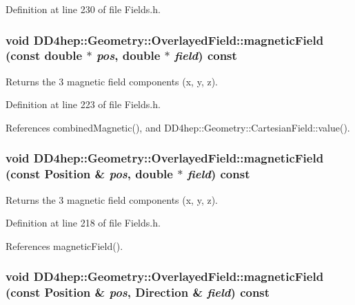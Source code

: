 Definition at line 230 of file Fields.h.\hypertarget{class_d_d4hep_1_1_geometry_1_1_overlayed_field_ae02970e5b4ec1575adcfdb05345e7316}{
\subsubsection[{magneticField}]{\setlength{\rightskip}{0pt plus 5cm}void DD4hep::Geometry::OverlayedField::magneticField (const double $\ast$ {\em pos}, \/  double $\ast$ {\em field}) const}}
\label{class_d_d4hep_1_1_geometry_1_1_overlayed_field_ae02970e5b4ec1575adcfdb05345e7316}


Returns the 3 magnetic field components (x, y, z). 

Definition at line 223 of file Fields.h.

References combinedMagnetic(), and DD4hep::Geometry::CartesianField::value().\hypertarget{class_d_d4hep_1_1_geometry_1_1_overlayed_field_afa24afd69fe7a4f1730ee4d14b2e9559}{
\subsubsection[{magneticField}]{\setlength{\rightskip}{0pt plus 5cm}void DD4hep::Geometry::OverlayedField::magneticField (const {\bf Position} \& {\em pos}, \/  double $\ast$ {\em field}) const}}
\label{class_d_d4hep_1_1_geometry_1_1_overlayed_field_afa24afd69fe7a4f1730ee4d14b2e9559}


Returns the 3 magnetic field components (x, y, z). 

Definition at line 218 of file Fields.h.

References magneticField().\hypertarget{class_d_d4hep_1_1_geometry_1_1_overlayed_field_a7f94edbcb2a607da89c5ceca9167e900}{
\subsubsection[{magneticField}]{\setlength{\rightskip}{0pt plus 5cm}void DD4hep::Geometry::OverlayedField::magneticField (const {\bf Position} \& {\em pos}, \/  {\bf Direction} \& {\em field}) const}}
\label{class_d_d4hep_1_1_geometry_1_1_overlayed_field_a7f94edbcb2a607da89c5ceca9167e900}


